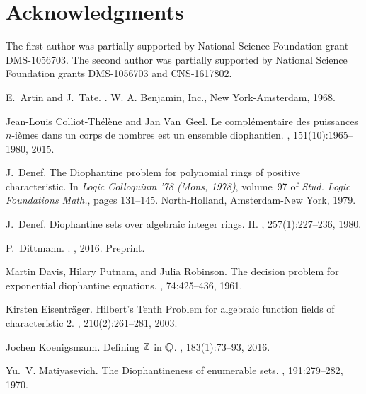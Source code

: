\documentclass[12pt,reqno]{amsart}
\theoremstyle{definition}
\begin{document}
	
	


\section*{Acknowledgments}
The first author was partially supported by National
  Science Foundation grant DMS-1056703.
The second author was partially
  supported by  National
  Science Foundation grants DMS-1056703 and CNS-1617802.
  
  
%
%
\begin{thebibliography}{CTVG15}

E.~Artin and J.~Tate.
.
\newblock W. A. Benjamin, Inc., New York-Amsterdam, 1968.

Jean-Louis Colliot-Th\'el\`ene and Jan Van~Geel.
\newblock Le compl\'ementaire des puissances {$n$}-i\`emes dans un corps de
  nombres est un ensemble diophantien.
, 151(10):1965--1980, 2015.

J.~Denef.
\newblock The {D}iophantine problem for polynomial rings of positive
  characteristic.
\newblock In {\em Logic {C}olloquium '78 ({M}ons, 1978)}, volume~97 of {\em
  Stud. Logic Foundations Math.}, pages 131--145. North-Holland, Amsterdam-New
  York, 1979.

J.~Denef.
\newblock Diophantine sets over algebraic integer rings. {II}.
, 257(1):227--236, 1980.

P.~Dittmann.
.
, 2016.
\newblock Preprint.

Martin Davis, Hilary Putnam, and Julia Robinson.
\newblock The decision problem for exponential diophantine equations.
, 74:425--436, 1961.

Kirsten Eisentr\"ager.
\newblock Hilbert's {T}enth {P}roblem for algebraic function fields of
  characteristic $2$.
, 210(2):261--281, 2003.

Jochen Koenigsmann.
\newblock Defining {$\Bbb Z$} in {$\Bbb Q$}.
, 183(1):73--93, 2016.

Yu.~V. Matiyasevich.
\newblock The {D}iophantineness of enumerable sets.
, 191:279--282, 1970.


\end{thebibliography}
\end{document}
